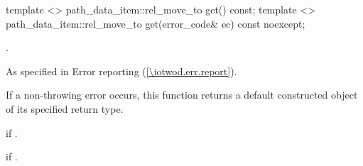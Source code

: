 \begin{itemdecl}
    template <>
    path_data_item::rel_move_to get() const;
    template <>
    path_data_item::rel_move_to get(error_code& ec) const noexcept;
\end{itemdecl}
\begin{itemdescr}
	\pnum
	\returns
	.
	
	\pnum
	\throws
	As specified in Error reporting (\ref{\iotwod.err.report}).
	
	\pnum
	\remarks
	If a non-throwing error occurs, this function returns a default constructed object of its specified return type.
	
	\pnum
	\errors
	 if .
	
	\pnum
	 if .

\end{itemdescr}
